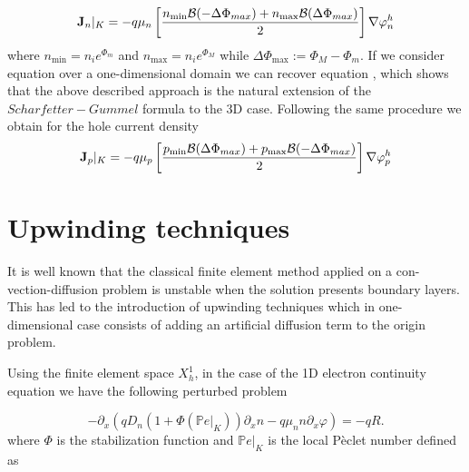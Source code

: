\begin{equation}
\label{eq: first formula for J}
\mathbf{J}_n|_K = -  q \mu_n  \left[ \dfrac{ n_{\min} \mathcal{B}(-\Delta \Phi_{max})  + n_{\max}\mathcal{B}(\Delta \Phi_{max})}{2} \right]\nabla \varphi_n^h
\end{equation}
where $n_{\min}=n_i e^{\Phi_m}$ and $n_{\max}=n_i e^{\Phi_M}$ while $\Delta \Phi_{\max} := \Phi_M - \Phi_m$. If we consider equation  over a one-dimensional domain we can recover equation , which shows that the above described approach is the natural extension of the $Scharfetter-Gummel$ formula to the 3D case.
Following the same procedure we obtain for the hole current density
\begin{equation}
\label{eq: first formula for Jp}
\mathbf{J}_p|_K = -  q \mu_p  \left[ \dfrac{ p_{\min} \mathcal{B}(\Delta \Phi_{max})  + p_{\max}\mathcal{B}(-\Delta \Phi_{max})}{2} \right]\nabla \varphi_p^h
\end{equation}


\section{Upwinding techniques}

It is well known that the classical finite element method applied on a con- vection-diffusion problem is unstable when the solution presents boundary layers. This has led to the introduction of upwinding techniques which in one-dimensional case consists of adding an artificial diffusion term to the origin problem.


Using the finite element space $X_h^1$, in the case of the 1D electron continuity equation we have the following perturbed problem

\begin{equation}
\label{eq: perturbed problem}
- \partial_x  (qD_n(1+\Phi(\mathbb{P}e|_K))\partial_x n - q \mu_n n \partial_x \varphi) = -qR.
\end{equation}
where $\Phi$ is the stabilization function and $\mathbb{P}e|_K$ is the local P\`eclet number defined as 
 
